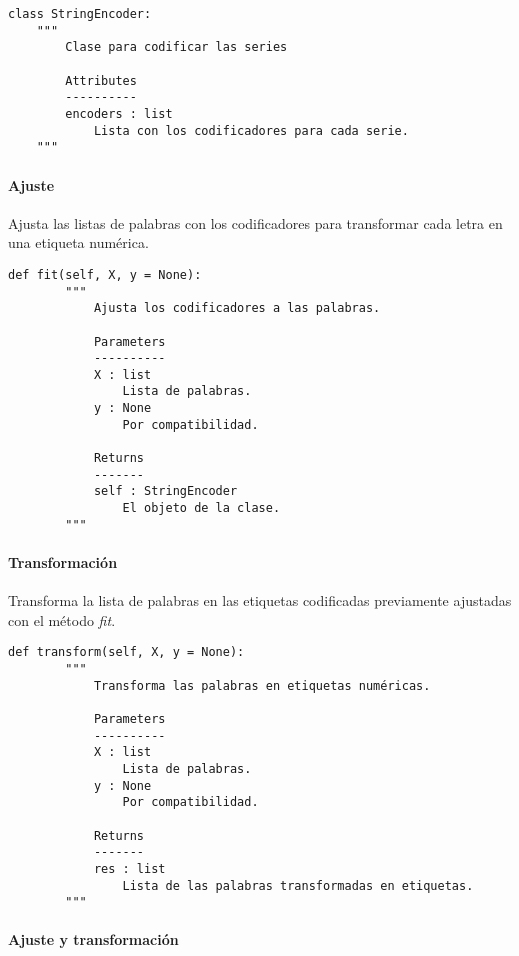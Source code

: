 \begin{lstlisting}
class StringEncoder:
    """
        Clase para codificar las series

        Attributes
        ----------
        encoders : list
            Lista con los codificadores para cada serie.
    """
\end{lstlisting}

\paragraph{Ajuste}

Ajusta las listas de palabras con los codificadores para transformar cada letra en una etiqueta numérica.

\begin{lstlisting}
def fit(self, X, y = None):
        """
            Ajusta los codificadores a las palabras.

            Parameters
            ----------
            X : list
                Lista de palabras.
            y : None
                Por compatibilidad.

            Returns
            -------
            self : StringEncoder
                El objeto de la clase.
        """
\end{lstlisting}

\paragraph{Transformación}

Transforma la lista de palabras en las etiquetas codificadas previamente ajustadas con el método \emph{fit}.

\begin{lstlisting}
def transform(self, X, y = None):
        """
            Transforma las palabras en etiquetas numéricas.

            Parameters
            ----------
            X : list
                Lista de palabras.
            y : None
                Por compatibilidad.

            Returns
            -------
            res : list
                Lista de las palabras transformadas en etiquetas.
        """
\end{lstlisting}

\paragraph{Ajuste y transformación}

